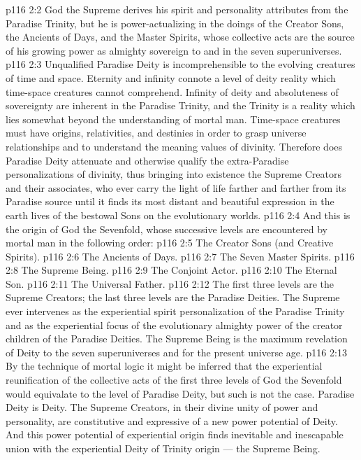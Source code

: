 \vs p116 2:2 God the Supreme derives his spirit and personality attributes from the Paradise Trinity, but he is power\hyp{}actualizing in the doings of the Creator Sons, the Ancients of Days, and the Master Spirits, whose collective acts are the source of his growing power as almighty sovereign to and in the seven superuniverses.
\vs p116 2:3 \pc Unqualified Paradise Deity is incomprehensible to the evolving creatures of time and space. Eternity and infinity connote a level of deity reality which time\hyp{}space creatures cannot comprehend. Infinity of deity and absoluteness of sovereignty are inherent in the Paradise Trinity, and the Trinity is a reality which lies somewhat beyond the understanding of mortal man. Time\hyp{}space creatures must have origins, relativities, and destinies in order to grasp universe relationships and to understand the meaning values of divinity. Therefore does Paradise Deity attenuate and otherwise qualify the extra\hyp{}Paradise personalizations of divinity, thus bringing into existence the Supreme Creators and their associates, who ever carry the light of life farther and farther from its Paradise source until it finds its most distant and beautiful expression in the earth lives of the bestowal Sons on the evolutionary worlds.
\vs p116 2:4 And this is the origin of God the Sevenfold, whose successive levels are encountered by mortal man in the following order:
\vs p116 2:5 \bibnobreakspace The Creator Sons (and Creative Spirits).
\vs p116 2:6 \bibnobreakspace The Ancients of Days.
\vs p116 2:7 \bibnobreakspace The Seven Master Spirits.
\vs p116 2:8 \bibnobreakspace The Supreme Being.
\vs p116 2:9 \bibnobreakspace The Conjoint Actor.
\vs p116 2:10 \bibnobreakspace The Eternal Son.
\vs p116 2:11 \bibnobreakspace The Universal Father.
\vs p116 2:12 \pc The first three levels are the Supreme Creators; the last three levels are the Paradise Deities. The Supreme ever intervenes as the experiential spirit personalization of the Paradise Trinity and as the experiential focus of the evolutionary almighty power of the creator children of the Paradise Deities. The Supreme Being is the maximum revelation of Deity to the seven superuniverses and for the present universe age.
\vs p116 2:13 By the technique of mortal logic it might be inferred that the experiential reunification of the collective acts of the first three levels of God the Sevenfold would equivalate to the level of Paradise Deity, but such is not the case. Paradise Deity is  Deity. The Supreme Creators, in their divine unity of power and personality, are constitutive and expressive of a new power potential of  Deity. And this power potential of experiential origin finds inevitable and inescapable union with the experiential Deity of Trinity origin --- the Supreme Being.
